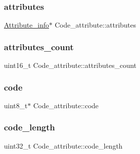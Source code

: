 \subsubsection{\texorpdfstring{attributes}{attributes}}
{\footnotesize\ttfamily \hyperlink{struct_attribute__info}{Attribute\+\_\+info}$\ast$ Code\+\_\+attribute\+::attributes}

\hypertarget{struct_code__attribute_a427831d5d25cf89493a6c31ac1eb5f6c}{}\label{struct_code__attribute_a427831d5d25cf89493a6c31ac1eb5f6c} 
\subsubsection{\texorpdfstring{attributes\+\_\+count}{attributes\_count}}
{\footnotesize\ttfamily uint16\+\_\+t Code\+\_\+attribute\+::attributes\+\_\+count}

\hypertarget{struct_code__attribute_aac89489ffa8b8e2832e7f4b8097c7454}{}\label{struct_code__attribute_aac89489ffa8b8e2832e7f4b8097c7454} 
\subsubsection{\texorpdfstring{code}{code}}
{\footnotesize\ttfamily uint8\+\_\+t$\ast$ Code\+\_\+attribute\+::code}

\hypertarget{struct_code__attribute_a0ce11f0112ca510588549aa7c9f0866c}{}\label{struct_code__attribute_a0ce11f0112ca510588549aa7c9f0866c} 
\subsubsection{\texorpdfstring{code\+\_\+length}{code\_length}}
{\footnotesize\ttfamily uint32\+\_\+t Code\+\_\+attribute\+::code\+\_\+length}

\hypertarget{struct_code__attribute_a5ca80b8b400a20e11cbbbfa1af39fd3c}{}\label{struct_code__attribute_a5ca80b8b400a20e11cbbbfa1af39fd3c} 
